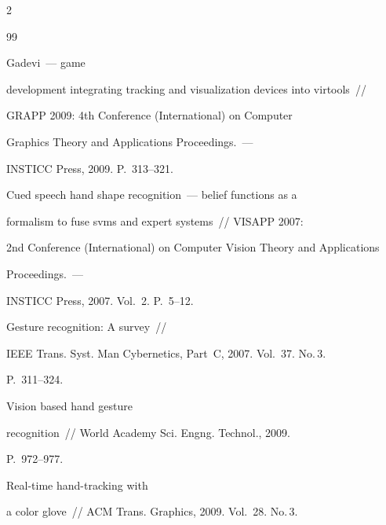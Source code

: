 \begin{multicols}{2}
{{\begin{thebibliography}{99}


 Gadevi~--- game


  development integrating tracking and visualization devices into virtools~//


  GRAPP 2009:  4th Conference (International) on Computer


  Graphics Theory and Applications Proceedings.~---


INSTICC Press, 2009. P.~313--321.









  Cued speech hand shape recognition~--- belief functions as a


  formalism to fuse svms and expert systems~// VISAPP 2007: 


2nd Conference (International) on Computer Vision Theory and Applications


  Proceedings.~---


INSTICC Press, 2007.  Vol.~2. P.~5--12.







 Gesture recognition: A survey~//


  IEEE Trans. Syst. Man Cybernetics, Part~C, 2007. Vol.~37. No.\,3.


P.~311--324.







 Vision based hand gesture


  recognition~// World Academy Sci. Engng. Technol., 2009.


P.~972--977.







 Real-time hand-tracking with


  a color glove~// ACM Trans. Graphics, 2009. Vol.~28. No.\,3.








\end{thebibliography}}}
\end{multicols}
